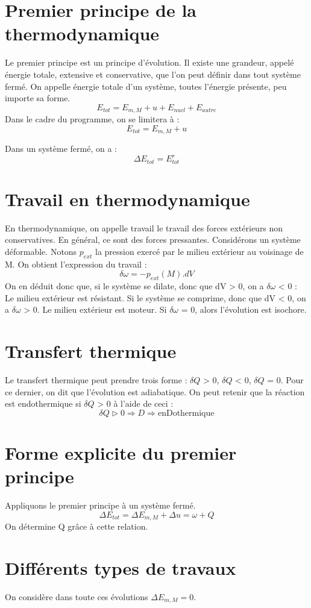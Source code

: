 \section{Premier principe de la thermodynamique}
\begin{de}
Le premier principe est un principe d'évolution.
Il existe une grandeur, appelé énergie totale, extensive et conservative, que l'on peut définir dans tout système fermé.
On appelle énergie totale d'un système, toutes l'énergie présente, peu importe sa forme.
$$E_{tot}=E_{m,M}+u+E_{nucl}+E_{autre}$$
Dans le cadre du programme, on se limitera à : 
$$E_{tot}=E_{m,M}+u$$
\end{de}
Dans un système fermé, on a : 
$$\Delta E_{tot} = E^{r}_{tot}$$
\section{Travail en thermodynamique}
\begin{de}
En thermodynamique, on appelle travail le travail des forces extérieurs non conservatives. En général, ce sont des forces pressantes.
Considérons un système déformable. Notons $p_{ext}$ la pression exercé par le milieu extérieur au voisinage de M. On obtient l'expression du travail :
$$\delta\omega = -p_{ext}(M).dV$$
On en déduit donc que, si le système se dilate, donc que dV > 0, on a $\delta\omega$ < 0 : Le milieu extérieur est résistant.
Si le système se comprime, donc que dV < 0, on a $\delta\omega$ > 0. Le milieu extérieur est moteur.
Si $\delta\omega$ = 0, alors l'évolution est isochore.
\end{de}
\section{Transfert thermique}
Le transfert thermique peut prendre trois forme : 
$\delta Q$ > 0, $\delta Q$ < 0, $\delta Q$ = 0.
Pour ce dernier, on dit que l'évolution est adiabatique. On peut retenir que la réaction est endothermique si $\delta Q$ > 0 à l'aide de ceci : 
$$\delta Q \rhd 0 \Rightarrow D \Rightarrow \mbox{enDothermique}$$
\section{Forme explicite du premier principe}
Appliquons le premier principe à un système fermé.
$$\Delta E_{tot} = \Delta E_{m,M} + \Delta u = \omega + Q$$
On détermine Q grâce à cette relation.
\section{Différents types de travaux}
On considère dans toute ces évolutions $\Delta E_{m,M} = 0$. 
